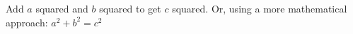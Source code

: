 Add $a$ squared and $b$ squared 
to get $c$ squared. Or, using 
a more mathematical approach: 
$a^2 + b^2 = c^2$ 